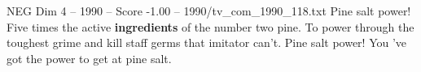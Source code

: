 \begin{textsample}{NEG Dim 4 – 1990 – Score -1.00 – 1990/tv\_com\_1990\_118.txt}  \label{ex:f4_neg_075}
Pine salt power!
Five times the active \textbf{ingredients} of the number two pine.
To power through the toughest grime and kill staff germs that imitator can't.
Pine salt power!
You 've got the power to get at pine salt.

\end{textsample}
